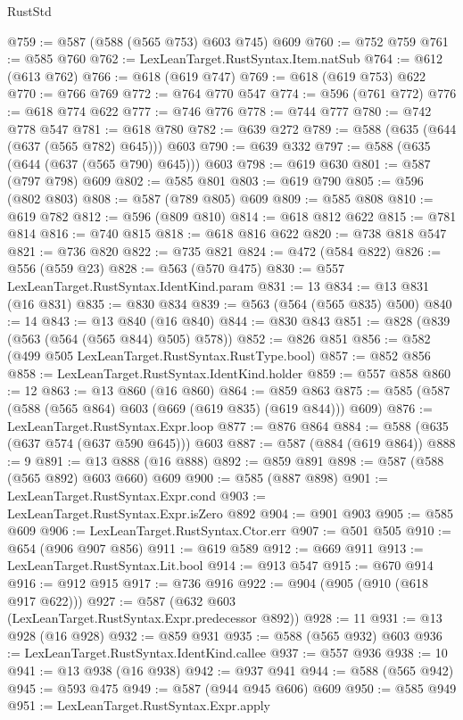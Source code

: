 \begin{lexlean}{RustStd}
\begin{coremodule}
@759 := @587 (@588 (@565 @753) @603 @745) @609
@760 := @752 @759
@761 := @585 @760
@762 := LexLeanTarget.RustSyntax.Item.natSub
@764 := @612 (@613 @762)
@766 := @618 (@619 @747)
@769 := @618 (@619 @753) @622
@770 := @766 @769
@772 := @764 @770 @547
@774 := @596 (@761 @772)
@776 := @618 @774 @622
@777 := @746 @776
@778 := @744 @777
@780 := @742 @778 @547
@781 := @618 @780
@782 := @639 @272
@789 := @588 (@635 (@644 (@637 (@565 @782) @645))) @603
@790 := @639 @332
@797 := @588 (@635 (@644 (@637 (@565 @790) @645))) @603
@798 := @619 @630
@801 := @587 (@797 @798) @609
@802 := @585 @801
@803 := @619 @790
@805 := @596 (@802 @803)
@808 := @587 (@789 @805) @609
@809 := @585 @808
@810 := @619 @782
@812 := @596 (@809 @810)
@814 := @618 @812 @622
@815 := @781 @814
@816 := @740 @815
@818 := @618 @816 @622
@820 := @738 @818 @547
@821 := @736 @820
@822 := @735 @821
@824 := @472 (@584 @822)
@826 := @556 (@559 @23)
@828 := @563 (@570 @475)
@830 := @557 LexLeanTarget.RustSyntax.IdentKind.param
@831 := 13
@834 := @13 @831 (@16 @831)
@835 := @830 @834
@839 := @563 (@564 (@565 @835) @500)
@840 := 14
@843 := @13 @840 (@16 @840)
@844 := @830 @843
@851 := @828 (@839 (@563 (@564 (@565 @844) @505) @578))
@852 := @826 @851
@856 := @582 (@499 @505 LexLeanTarget.RustSyntax.RustType.bool)
@857 := @852 @856
@858 := LexLeanTarget.RustSyntax.IdentKind.holder
@859 := @557 @858
@860 := 12
@863 := @13 @860 (@16 @860)
@864 := @859 @863
@875 := @585 (@587 (@588 (@565 @864) @603 (@669 (@619 @835) (@619 @844))) @609)
@876 := LexLeanTarget.RustSyntax.Expr.loop
@877 := @876 @864
@884 := @588 (@635 (@637 @574 (@637 @590 @645))) @603
@887 := @587 (@884 (@619 @864))
@888 := 9
@891 := @13 @888 (@16 @888)
@892 := @859 @891
@898 := @587 (@588 (@565 @892) @603 @660) @609
@900 := @585 (@887 @898)
@901 := LexLeanTarget.RustSyntax.Expr.cond
@903 := LexLeanTarget.RustSyntax.Expr.isZero @892
@904 := @901 @903
@905 := @585 @609
@906 := LexLeanTarget.RustSyntax.Ctor.err
@907 := @501 @505
@910 := @654 (@906 @907 @856)
@911 := @619 @589
@912 := @669 @911
@913 := LexLeanTarget.RustSyntax.Lit.bool
@914 := @913 @547
@915 := @670 @914
@916 := @912 @915
@917 := @736 @916
@922 := @904 (@905 (@910 (@618 @917 @622)))
@927 := @587 (@632 @603 (LexLeanTarget.RustSyntax.Expr.predecessor @892))
@928 := 11
@931 := @13 @928 (@16 @928)
@932 := @859 @931
@935 := @588 (@565 @932) @603
@936 := LexLeanTarget.RustSyntax.IdentKind.callee
@937 := @557 @936
@938 := 10
@941 := @13 @938 (@16 @938)
@942 := @937 @941
@944 := @588 (@565 @942)
@945 := @593 @475
@949 := @587 (@944 @945 @606) @609
@950 := @585 @949
@951 := LexLeanTarget.RustSyntax.Expr.apply

\end{coremodule}
\end{lexlean}
